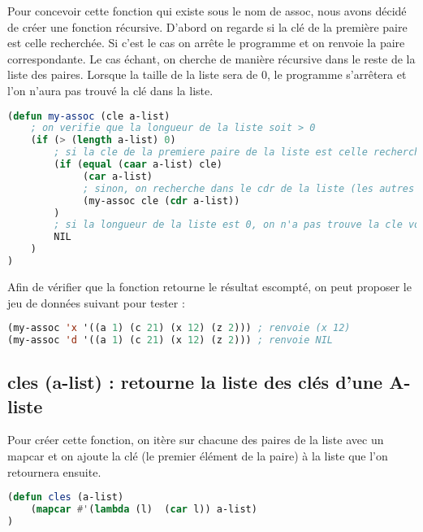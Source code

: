 \documentclass[a4paper, 12pt]{article}
\begin{document}
Pour concevoir cette fonction qui existe sous le nom de assoc, nous avons décidé de créer une fonction récursive. D’abord on regarde si la clé de la première paire est celle recherchée. Si c’est le cas on arrête le programme et on renvoie la paire correspondante. Le cas échant, on cherche de manière récursive dans le reste de la liste des paires. Lorsque la taille de la liste sera de 0, le programme s’arrêtera et l’on n’aura pas trouvé la clé dans la liste.
\vspace{2mm}

\begin{lstlisting}[language=Lisp]
(defun my-assoc (cle a-list)
    ; on verifie que la longueur de la liste soit > 0
    (if (> (length a-list) 0)
        ; si la cle de la premiere paire de la liste est celle recherchee, on renvoie la paire
        (if (equal (caar a-list) cle)
             (car a-list)
             ; sinon, on recherche dans le cdr de la liste (les autres paires) placee en parametres
             (my-assoc cle (cdr a-list))
        )
        ; si la longueur de la liste est 0, on n'a pas trouve la cle voulue dans les paires
        NIL
    )
)
\end{lstlisting}
\vspace{2mm}

Afin de vérifier que la fonction retourne le résultat escompté, on peut proposer le jeu de données suivant pour tester :
\vspace{2mm}

\begin{lstlisting}[language=Lisp]
(my-assoc 'x '((a 1) (c 21) (x 12) (z 2))) ; renvoie (x 12)
(my-assoc 'd '((a 1) (c 21) (x 12) (z 2))) ; renvoie NIL
\end{lstlisting}
\vspace{5mm}

\subsection{cles (a-list) : retourne la liste des clés d'une A-liste}
\vspace{3mm}

Pour créer cette fonction, on itère sur chacune des paires de la liste avec un mapcar et on ajoute la clé (le premier élément de la paire) à la liste que l’on retournera ensuite.
\vspace{2mm}

\begin{lstlisting}[language=Lisp]
(defun cles (a-list)
    (mapcar #'(lambda (l)  (car l)) a-list)
)
\end{lstlisting}
\vspace{2mm}
\end{document}
